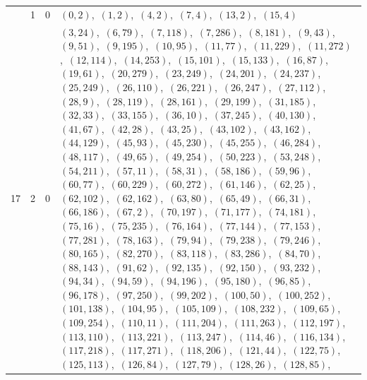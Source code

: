 \documentclass[11pt]{article}
\begin{document}
\begin{longtable}{@{}rrl>{\raggedright\arraybackslash}p{}@{}}
\addlinespace[3pt]
17 & 1 & $0$ & $(0,2)$,\allowbreak\ $(1,2)$,\allowbreak\ $(4,2)$,\allowbreak\ $(7,4)$,\allowbreak\ $(13,2)$,\allowbreak\ $(15,4)$\\
17 & 2 & $0$ & $(3,24)$,\allowbreak\ $(6,79)$,\allowbreak\ $(7,118)$,\allowbreak\ $(7,286)$,\allowbreak\ $(8,181)$,\allowbreak\ $(9,43)$,\allowbreak\ $(9,51)$,\allowbreak\ $(9,195)$,\allowbreak\ $(10,95)$,\allowbreak\ $(11,77)$,\allowbreak\ $(11,229)$,\allowbreak\ $(11,272)$,\allowbreak\ $(12,114)$,\allowbreak\ $(14,253)$,\allowbreak\ $(15,101)$,\allowbreak\ $(15,133)$,\allowbreak\ $(16,87)$,\allowbreak\ $(19,61)$,\allowbreak\ $(20,279)$,\allowbreak\ $(23,249)$,\allowbreak\ $(24,201)$,\allowbreak\ $(24,237)$,\allowbreak\ $(25,249)$,\allowbreak\ $(26,110)$,\allowbreak\ $(26,221)$,\allowbreak\ $(26,247)$,\allowbreak\ $(27,112)$,\allowbreak\ $(28,9)$,\allowbreak\ $(28,119)$,\allowbreak\ $(28,161)$,\allowbreak\ $(29,199)$,\allowbreak\ $(31,185)$,\allowbreak\ $(32,33)$,\allowbreak\ $(33,155)$,\allowbreak\ $(36,10)$,\allowbreak\ $(37,245)$,\allowbreak\ $(40,130)$,\allowbreak\ $(41,67)$,\allowbreak\ $(42,28)$,\allowbreak\ $(43,25)$,\allowbreak\ $(43,102)$,\allowbreak\ $(43,162)$,\allowbreak\ $(44,129)$,\allowbreak\ $(45,93)$,\allowbreak\ $(45,230)$,\allowbreak\ $(45,255)$,\allowbreak\ $(46,284)$,\allowbreak\ $(48,117)$,\allowbreak\ $(49,65)$,\allowbreak\ $(49,254)$,\allowbreak\ $(50,223)$,\allowbreak\ $(53,248)$,\allowbreak\ $(54,211)$,\allowbreak\ $(57,11)$,\allowbreak\ $(58,31)$,\allowbreak\ $(58,186)$,\allowbreak\ $(59,96)$,\allowbreak\ $(60,77)$,\allowbreak\ $(60,229)$,\allowbreak\ $(60,272)$,\allowbreak\ $(61,146)$,\allowbreak\ $(62,25)$,\allowbreak\ $(62,102)$,\allowbreak\ $(62,162)$,\allowbreak\ $(63,80)$,\allowbreak\ $(65,49)$,\allowbreak\ $(66,31)$,\allowbreak\ $(66,186)$,\allowbreak\ $(67,2)$,\allowbreak\ $(70,197)$,\allowbreak\ $(71,177)$,\allowbreak\ $(74,181)$,\allowbreak\ $(75,16)$,\allowbreak\ $(75,235)$,\allowbreak\ $(76,164)$,\allowbreak\ $(77,144)$,\allowbreak\ $(77,153)$,\allowbreak\ $(77,281)$,\allowbreak\ $(78,163)$,\allowbreak\ $(79,94)$,\allowbreak\ $(79,238)$,\allowbreak\ $(79,246)$,\allowbreak\ $(80,165)$,\allowbreak\ $(82,270)$,\allowbreak\ $(83,118)$,\allowbreak\ $(83,286)$,\allowbreak\ $(84,70)$,\allowbreak\ $(88,143)$,\allowbreak\ $(91,62)$,\allowbreak\ $(92,135)$,\allowbreak\ $(92,150)$,\allowbreak\ $(93,232)$,\allowbreak\ $(94,34)$,\allowbreak\ $(94,59)$,\allowbreak\ $(94,196)$,\allowbreak\ $(95,180)$,\allowbreak\ $(96,85)$,\allowbreak\ $(96,178)$,\allowbreak\ $(97,250)$,\allowbreak\ $(99,202)$,\allowbreak\ $(100,50)$,\allowbreak\ $(100,252)$,\allowbreak\ $(101,138)$,\allowbreak\ $(104,95)$,\allowbreak\ $(105,109)$,\allowbreak\ $(108,232)$,\allowbreak\ $(109,65)$,\allowbreak\ $(109,254)$,\allowbreak\ $(110,11)$,\allowbreak\ $(111,204)$,\allowbreak\ $(111,263)$,\allowbreak\ $(112,197)$,\allowbreak\ $(113,110)$,\allowbreak\ $(113,221)$,\allowbreak\ $(113,247)$,\allowbreak\ $(114,46)$,\allowbreak\ $(116,134)$,\allowbreak\ $(117,218)$,\allowbreak\ $(117,271)$,\allowbreak\ $(118,206)$,\allowbreak\ $(121,44)$,\allowbreak\ $(122,75)$,\allowbreak\ $(125,113)$,\allowbreak\ $(126,84)$,\allowbreak\ $(127,79)$,\allowbreak\ $(128,26)$,\allowbreak\ $(128,85)$,\allowbreak\ 
\end{longtable}
\end{document}
